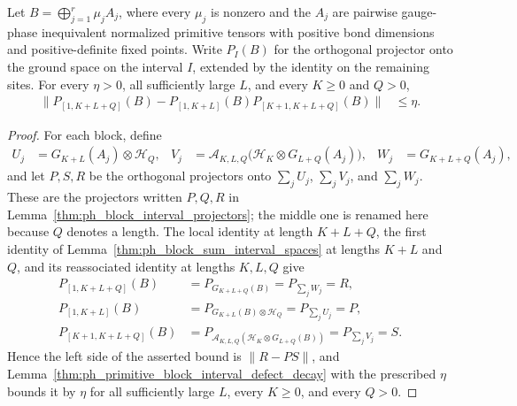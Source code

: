 \begin{lemma}
    \label{thm:ph_block_diagonal_projector_decay}
    \leanok
    Let $B=\bigoplus_{j=1}^r\mu_jA_j$, where every $\mu_j$ is nonzero
    and the $A_j$ are pairwise gauge-phase inequivalent normalized primitive
    tensors with positive bond dimensions and positive-definite fixed
    points. Write $P_I(B)$ for the orthogonal projector onto the ground
    space on the interval $I$, extended by the identity on the remaining
    sites. For every $\eta>0$, all sufficiently large $L$, and every
    $K\geq0$ and $Q>0$,
    \begin{align}
        \bigl\lVert P_{[1,K+L+Q]}(B)
        -P_{[1,K+L]}(B)P_{[K+1,K+L+Q]}(B)\bigr\rVert
         & \leq\eta.
    \end{align}
\end{lemma}
\begin{proof}
    \leanok
    For each block, define
    \begin{align}
        U_j & =G_{K+L}(A_j)\otimes\mathcal H_Q,                                &
        V_j & =\mathscr A_{K,L,Q}\bigl(\mathcal H_K\otimes G_{L+Q}(A_j)\bigr), &
        W_j & =G_{K+L+Q}(A_j),
    \end{align}
    and let $P,S,R$ be the orthogonal projectors onto $\sum_jU_j$,
    $\sum_jV_j$, and $\sum_jW_j$. These are the projectors written $P,Q,R$
    in Lemma~\ref{thm:ph_block_interval_projectors}; the middle one is
    renamed here because $Q$ denotes a length. The local identity at
    length $K+L+Q$, the first identity of
    Lemma~\ref{thm:ph_block_sum_interval_spaces} at lengths $K+L$ and $Q$,
    and its reassociated identity at lengths $K,L,Q$ give
    \begin{align}
        P_{[1,K+L+Q]}(B)   & =P_{G_{K+L+Q}(B)}
        =P_{\sum_jW_j}=R,                                               \\
        P_{[1,K+L]}(B)     & =P_{G_{K+L}(B)\otimes\mathcal H_Q}
        =P_{\sum_jU_j}=P,                                               \\
        P_{[K+1,K+L+Q]}(B) & =P_{\mathscr A_{K,L,Q}(\mathcal H_K\otimes
                G_{L+Q}(B))}=P_{\sum_jV_j}=S.
    \end{align}
    Hence the left side of the asserted bound is $\lVert R-PS\rVert$, and
    Lemma~\ref{thm:ph_primitive_block_interval_defect_decay} with the
    prescribed $\eta$ bounds it by $\eta$ for all sufficiently large $L$,
    every $K\geq0$, and every $Q>0$.
\end{proof}
